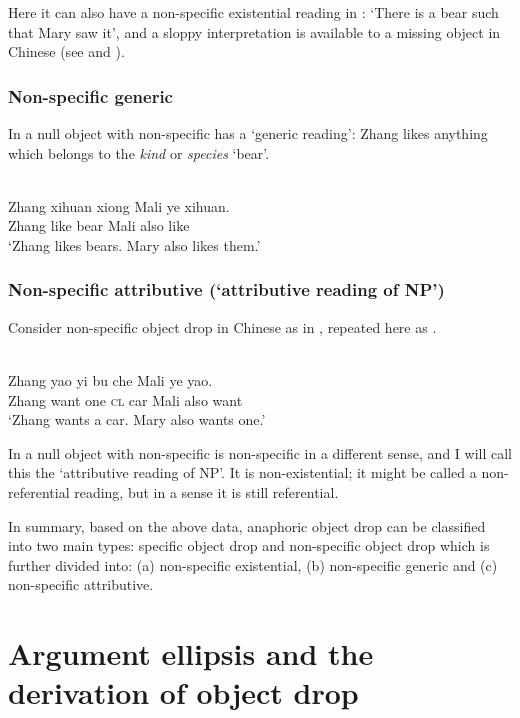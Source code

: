 \documentclass[output=paper]{LSP/langsci}
\begin{document}
Here it can also have a non-specific existential reading in : ‘There is a bear such that Mary saw it’, and a sloppy interpretation is available to a missing object in Chinese (see  and ).


\subsubsection{Non-specific generic}


In  a null object with non-specific  has a ‘generic reading’: Zhang likes anything which belongs to the \textit{kind} or \textit{species} ‘bear’.


\ea%
    \label{ex:li:6}
\\
    \gll   Zhang  xihuan xiong   Mali   ye   xihuan.        \\
	Zhang  like    bear   Mali   also   like  \\
    \glt `Zhang likes bears.  Mary also likes them.'

    \z


\subsubsection{Non-specific attributive (‘attributive reading of NP’)}
Consider non-specific object drop in Chinese as in , repeated here as .


\ea%
    \label{ex:li:7}
\\
    \gll     Zhang  yao   yi  bu   che   Mali   ye   yao.      \\
Zhang  want   one \textsc{cl}  car   Mali   also   want  	\\
    \glt `Zhang wants a car.  Mary also wants one.'
    \z


\noindent In  a null object with non-specific  is non-specific in a different sense, and I will call this the ‘attributive reading of NP’. It is non-existential; it might be called a non-referential reading, but in a sense it is still referential.


In summary, based on the above data, anaphoric object drop can be classified into two main types:  specific object drop and  non-specific object drop which is further divided into: (a) non-specific existential, (b) non-specific generic and (c) non-specific attributive.


\section{Argument ellipsis and the derivation of object drop}
\end{document}
